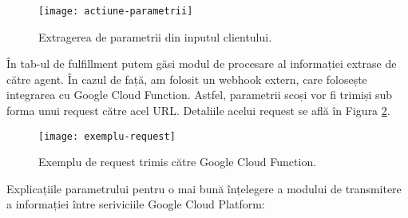 \begin{figure}[h]
    \centering
    \texttt{[image: actiune-parametrii]}
    \caption{Extragerea de parametrii din inputul clientului.}
    \label{fig:actiune-parametrii}
\end{figure}

În tab-ul de fulfillment putem găsi modul de procesare al informației extrase de către agent. În cazul de față, am folosit un webhook extern, care folosește integrarea cu Google Cloud Function. Astfel, parametrii scoși vor fi trimiși sub forma unui request către acel URL. Detaliile acelui request se află în Figura \ref{fig:exemplu-request}.

\begin{figure}[h]
    \centering
    \texttt{[image: exemplu-request]}
    \caption{Exemplu de request trimis către Google Cloud Function.}
    \label{fig:exemplu-request}
\end{figure}

Explicațiile parametrului pentru o mai bună înțelegere a modului de transmitere a informației între seriviciile Google Cloud Platform:

